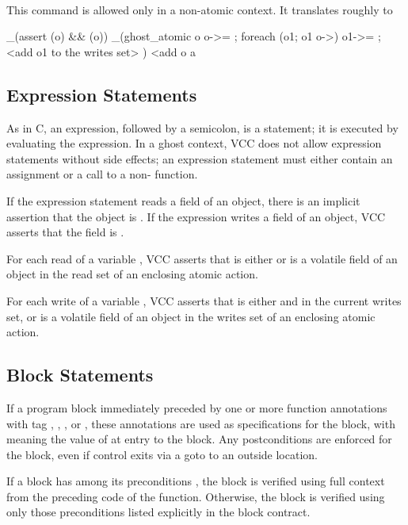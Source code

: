 \documentclass[preprint,nocopyrightspace]{sigplanconf}
\begin{document}
{{{\\
This command is allowed only in a non-atomic context. It translates roughly to
\begin{VCC}
  _(assert \wrapped(o) && \writable(o))
  _(ghost_atomic o {
    o->\closed = \false;
    foreach (\object o1; o1 \in o->\owns) 
      o1->\owner = \me;
      <add o1 to the writes set>
  })
  <add o a
\end{VCC}


\subsection{Expression Statements}
As in C, an expression, followed by a semicolon, is a statement; it is
executed by evaluating the expression. In a ghost context, VCC does
not allow expression statements without side effects; an expression
statement must either contain an assignment or a call to a
non-\vcc{\pure} function.

If the expression statement reads a field of an object, there is an
implicit assertion that the object is .
If the expression writes a field of an object, VCC asserts that the
field is \vcc{\writable}.  

For each read of a variable , VCC asserts that 
is either  or is a volatile field of an object in
the read set of an enclosing atomic action. 

For each write of a variable , VCC asserts that  is
either  and in the current writes set, or is a volatile
field of an object in the writes set of an enclosing atomic action.

\subsection{Block Statements}
If a program block immediately preceded by one or more function
annotations with tag , , ,
or , these annotations are used as specifications for the
block, with  meaning the value of  at entry to the
block. Any postconditions are enforced for the block, even if control
exits via a goto to an outside location.

If a block has among its
preconditions , the block is verified
using full context from the preceding code of the function. Otherwise,
the block is verified using only those preconditions listed explicitly
in the block contract.

}}}
\end{document}
